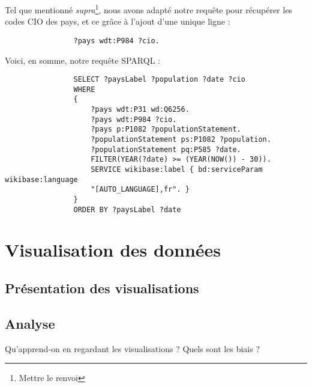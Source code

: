 \documentclass[hidelinks, 12pt]{article}
\begin{document}
			Tel que mentionné \emph{supra}\footnote{Mettre le renvoi}, nous avons adapté notre requête pour récupérer les codes CIO des pays, et ce grâce à l'ajout d'une unique ligne :
			
			\begin{verbatim}
				?pays wdt:P984 ?cio.
			\end{verbatim}
		
			Voici, en somme, notre requête SPARQL :

			\begin{verbatim}
				SELECT ?paysLabel ?population ?date ?cio
				WHERE 
				{
					?pays wdt:P31 wd:Q6256.
					?pays wdt:P984 ?cio.
					?pays p:P1082 ?populationStatement.
					?populationStatement ps:P1082 ?population. 
					?populationStatement pq:P585 ?date.
					FILTER(YEAR(?date) >= (YEAR(NOW()) - 30)).
					SERVICE wikibase:label { bd:serviceParam wikibase:language
					"[AUTO_LANGUAGE],fr". }
				}
				ORDER BY ?paysLabel ?date
			\end{verbatim}

	\section{Visualisation des données}
	
		\subsection{Présentation des visualisations}
		
		\subsection{Analyse}
		
		Qu'apprend-on en regardant les visualisations ? Quels sont les biais ?
		\newpage

	\tableofcontents
\end{document}
